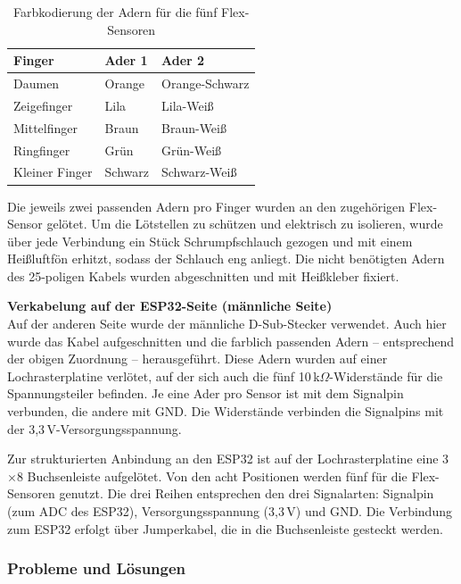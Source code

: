 \documentclass[12pt,a4paper]{article}
\begin{document}
\begin{table}[h]
\centering
\begin{tabular}{|l|l|l|}
\hline
\textbf{Finger} & \textbf{Ader 1} & \textbf{Ader 2} \\
\hline
Daumen         & Orange          & Orange-Schwarz \\
Zeigefinger    & Lila            & Lila-Weiß      \\
Mittelfinger   & Braun           & Braun-Weiß     \\
Ringfinger     & Grün            & Grün-Weiß      \\
Kleiner Finger & Schwarz         & Schwarz-Weiß   \\
\hline
\end{tabular}
\caption{Farbkodierung der Adern für die fünf Flex-Sensoren}
\end{table}

Die jeweils zwei passenden Adern pro Finger wurden an den zugehörigen 
Flex-Sensor gelötet. Um die Lötstellen zu schützen und elektrisch zu 
isolieren, wurde über jede Verbindung ein Stück Schrumpfschlauch gezogen 
und mit einem Heißluftfön erhitzt, sodass der Schlauch eng anliegt. Die 
nicht benötigten Adern des 25-poligen Kabels wurden abgeschnitten und mit 
Heißkleber fixiert.

\vspace{0.5em}
\textbf{Verkabelung auf der ESP32-Seite (männliche Seite)} \\
Auf der anderen Seite wurde der männliche D-Sub-Stecker verwendet. Auch 
hier wurde das Kabel aufgeschnitten und die farblich passenden Adern -- 
entsprechend der obigen Zuordnung -- herausgeführt. Diese Adern wurden 
auf einer Lochrasterplatine verlötet, auf der sich auch die fünf 
10\,k$\Omega$-Widerstände für die Spannungsteiler befinden. Je eine Ader 
pro Sensor ist mit dem Signalpin verbunden, die andere mit GND. Die 
Widerstände verbinden die Signalpins mit der 3{,}3\,V-Versorgungsspannung.

Zur strukturierten Anbindung an den ESP32 ist auf der Lochrasterplatine 
eine 3$\times$8 Buchsenleiste aufgelötet. Von den 
acht Positionen werden fünf für die Flex-Sensoren genutzt. Die drei Reihen 
entsprechen den drei Signalarten: Signalpin (zum ADC des ESP32), 
Versorgungsspannung (3{,}3\,V) und GND. Die Verbindung zum ESP32 erfolgt 
über Jumperkabel, die in die Buchsenleiste gesteckt werden.

\subsubsection{Probleme und Lösungen}
\end{document}
